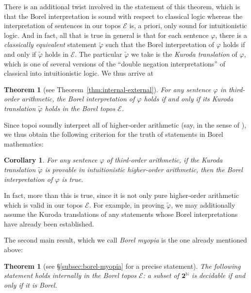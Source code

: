 \documentclass[11pt]{amsart}
\newcommand\cE{\mathcal{E}}
\newcommand{\N}{\mathbb{N}}
\renewcommand\phi{\varphi}
\newcommand\two{\mathbf{2}}
\theoremstyle{definition}
\theoremstyle{remark}
\theoremstyle{plain}
\newtheorem{thm}[defn]{Theorem}
\newtheorem*{cor*}{Corollary}
\begin{document}
There is an additional twist involved in the statement of this theorem, which is that the Borel interpretation is sound with respect to classical logic whereas the interpretation of sentences in our topos \( \cE \) is, a priori, only sound for intuitionistic logic.
And in fact, all that is true in general is that for each sentence \( \phi \), there is a \emph{classically equivalent} statement \( \tilde \phi \) such that the Borel interpretation of \( \phi \) holds if and only if \( \tilde \phi \) holds in \( \cE \).
The particular \( \tilde \phi \) we take is the \emph{Kuroda translation} of \( \phi \), which is one of several versions of the ``double negation interpretations'' of classical into intuitionistic logic.
We thus arrive at
{\renewcommand\thedefn{A}
\begin{thm}[see Theorem~\ref{thm:internal-external}]
  For any sentence \( \phi \) in third-order arithmetic, the Borel interpretation of \( \phi \) holds if and only if its Kuroda translation \( \tilde \phi \) holds in the Borel topos \( \cE \).
\end{thm}
}
Since topoi soundly interpret all of higher-order arithmetic (say, in the sense of \cite{lambek-scott}), we thus obtain the following criterion for the truth of statements in Borel mathematics:
\begin{cor*}
  For any sentence \( \phi \) of third-order arithmetic, if the Kuroda translation \( \tilde \phi \) is provable in intuitionistic higher-order arithmetic, then the Borel interpretation of \( \phi \) is true.
\end{cor*}
In fact, more than this is true, since it is not only pure higher-order arithmetic which is valid in our topos \( \cE \).
For example, in proving \( \tilde \phi \), we may additionally assume the Kuroda translations of any statements whose Borel interpretations have already been established.

The second main result, which we call \emph{Borel myopia} is the one already mentioned above:
{\renewcommand\thedefn{B}
\begin{thm}[see \S\ref{subsec:borel-myopia} for a precise statement]
  The following statement holds internally in the Borel topos \( \cE \): a subset of \( \two^\N \) is decidable if and only if it is Borel.
\end{thm}
}
\end{document}
